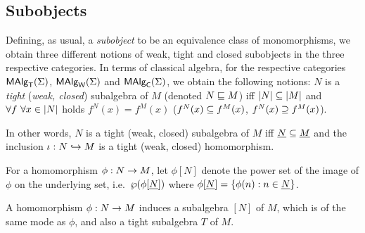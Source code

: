 \documentclass[10pt]{article}
\begin{document}

\subsection{Subobjects}
\label{sub:sub}

Defining, as usual, a {\em subobject\/} to be an equivalence class of
monomorphisms, we obtain three different notions of weak, tight and
closed subobjects in the three respective categories.  In terms of
classical algebra, for the respective categories $\mbox{\rm\sf MAlg}_{\sf T}(\Sigma)$, $\mbox{\rm\sf MAlg}_{\sf W}(\Sigma)$ and
$\mbox{\rm\sf MAlg}_{\sf C}(\Sigma)$, we obtain the following notions: $N$ is a {\em
tight} ({\em weak, closed\/}) subalgebra of $M$ (denoted $N\mathrel{\sqsubseteq} M$)
iff $|N|\subseteq|M|$ and $\forall f\ \forall x\in|N|$
holds $f^N(x)=f^M(x)$ ($f^N(x)\subseteq f^M(x)$, $f^N(x)\supseteq
f^M(x)$).

In other words, $N$ is a tight (weak, closed) subalgebra of $M$ iff
$\underline {N}\subseteq\underline {M}$ and the inclusion $\iota:N\hookrightarrow M$ is a
tight (weak, closed) homomorphism.

For a homomorphism $\phi:N\rightarrow M$, let $\phi[N]$ denote the power set
of the image of $\phi$ on the underlying set, i.e.\ $\wp(\phi[\underline {N}])$ where $\phi[\underline {N}]=\{\phi(n):n\in\underline {N}\}$.


\begin{Prop}
\label{le:subalgs}
A homomorphism $\phi:N\rightarrow M$ induces a subalgebra $[N]$ of $M$,
which is of the same mode as $\phi$, and also a tight subalgebra $T$ of
$M$.
\end{Prop}
\end{document}
